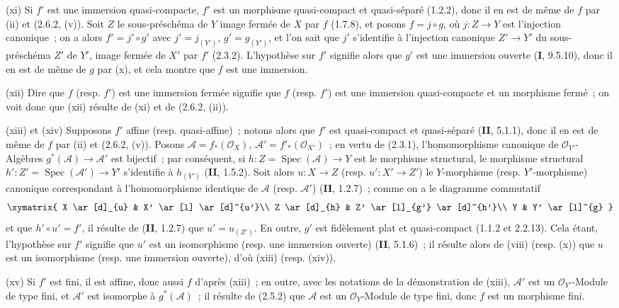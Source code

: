 (xi) Si $f'$ est une immersion quasi-compacte, $f'$ est un morphisme
quasi-compact et quasi-séparé (1.2.2), donc il en est de même de $f$ par (ii)
et (2.6.2, (v)). Soit $Z$ le sous-préschéma de $Y$ image fermée de $X$ par
$f$ (1.7.8), et posons $f=j\circ g$, où $j:Z\to Y$ est l'injection
canonique~; on a alors $f'=j'\circ g'$ avec $j'=j_{(Y')}$,
$g'=g_{(Y')}$, et l'on sait que $j'$ s'identifie à l'injection canonique
$Z'\to Y'$ du sous-préschéma $Z'$ de $Y'$, image fermée de $X'$ par $f'$
(2.3.2). L'hypothèse sur $f'$ signifie alors que $g'$ est une immersion
ouverte (\textbf{I}, 9.5.10), donc il en est de même de $g$ par (x), et cela montre
que $f$ est une immersion.

(xii) Dire que $f$ (resp. $f'$) est une immersion fermée signifie que
$f$ (resp. $f'$) est une immersion quasi-compacte et un morphisme fermé~; on
voit donc que (xii) résulte de (xi) et de (2.6.2, (ii)).

(xiii) et (xiv) Supposons $f'$ affine (resp. quasi-affine)~;
notons alors que $f'$ est quasi-compact et quasi-séparé (\textbf{II}, 5.1.1), donc il
en est de même de $f$ par (ii) et (2.6.2, (v)). Posons
$\mathcal A=f_*(\mathcal O_X)$, $\mathcal A'=f'_*(\mathcal O_{X'})$~; en
vertu de (2.3.1), l'homomorphisme canonique de $\mathcal O_{Y'}$-Algèbres
$g^*(\mathcal A)\to\mathcal A'$ est bijectif~; par conséquent, si
$h:Z=\operatorname{Spec}(\mathcal A)\to Y$ est le morphisme structural, le
morphisme structural $h':Z'=\operatorname{Spec}(\mathcal A')\to Y'$
s'identifie à $h_{(Y')}$ (\textbf{II}, 1.5.2). Soit alors $u:X\to Z$ (resp.
$u':X'\to Z'$) le $Y$-morphisme (resp. $Y'$-morphisme) canonique
correspondant à l'homomorphisme identique de $\mathcal A$ (resp.
$\mathcal A'$) (\textbf{II}, 1.2.7)~; comme on a le diagramme commutatif
\[
\xymatrix{
X \ar[d]_{u} & X' \ar[l] \ar[d]^{u'}\\
Z \ar[d]_{h} & Z' \ar[l]_{g'} \ar[d]^{h'}\\
Y & Y' \ar[l]^{g}
}
\]
et que $h'\circ u'=f'$, il résulte de (\textbf{II}, 1.2.7) que $u'=u_{(Z')}$. En
outre, $g'$ est fidèlement plat et quasi-compact (1.1.2 et 2.2.13). Cela
étant, l'hypothèse sur $f'$ signifie que $u'$ est un isomorphisme (resp. une
immersion ouverte) (\textbf{II}, 5.1.6)~; il résulte alors de (viii) (resp. (x)) que
$u$ est un isomorphisme (resp. une immersion ouverte), d'où (xiii) (resp.
(xiv)).

(xv) Si $f'$ est fini, il est affine, donc aussi $f$ d'après (xiii)~;
en outre, avec les notations de la démonstration de (xiii), $\mathcal A'$ est
un $\mathcal O_{Y'}$-Module de type fini, et $\mathcal A'$ est isomorphe à
$g^*(\mathcal A)$~; il résulte de (2.5.2) que $\mathcal A$ est un
$\mathcal O_Y$-Module de type fini, donc $f$ est un morphisme fini.

